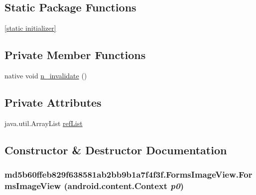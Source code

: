 \subsection*{Static Package Functions}
\begin{CompactItemize}
\item 
\hyperlink{classmd5b60ffeb829f638581ab2bb9b1a7f4f3f_1_1_forms_image_view_d7a9d7b066de9b48463ec4ffe8a2f41c}{\mbox{[}static initializer\mbox{]}}
\end{CompactItemize}
\subsection*{Private Member Functions}
\begin{CompactItemize}
\item 
native void \hyperlink{classmd5b60ffeb829f638581ab2bb9b1a7f4f3f_1_1_forms_image_view_3ff21f687d5c5d12663b6f5550c50550}{n\_\-invalidate} ()
\end{CompactItemize}
\subsection*{Private Attributes}
\begin{CompactItemize}
\item 
java.util.ArrayList \hyperlink{classmd5b60ffeb829f638581ab2bb9b1a7f4f3f_1_1_forms_image_view_b74a069616f95c91db7f837088703764}{refList}
\end{CompactItemize}


\subsection{Constructor \& Destructor Documentation}
\hypertarget{classmd5b60ffeb829f638581ab2bb9b1a7f4f3f_1_1_forms_image_view_ee489db3f6d7a8dfa9800139a04eaeda}{
\subsubsection[{FormsImageView}]{\setlength{\rightskip}{0pt plus 5cm}md5b60ffeb829f638581ab2bb9b1a7f4f3f.FormsImageView.FormsImageView (android.content.Context {\em p0})}}
\label{classmd5b60ffeb829f638581ab2bb9b1a7f4f3f_1_1_forms_image_view_ee489db3f6d7a8dfa9800139a04eaeda}


